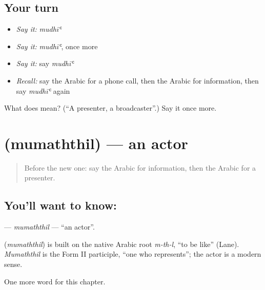\subsection*{Your turn}
\begin{itemize}
\raggedright
  \item \emph{Say it:} \emph{mudhīʿ}
  \item \emph{Say it:} \emph{mudhīʿ}, once more
  \item \emph{Say it:} say \emph{mudhīʿ}
  \item \emph{Recall:} say the Arabic for a phone call, then the Arabic for information, then say \emph{mudhīʿ} again
\end{itemize}

\begin{tcolorbox}[breakable,colback=teal!4,colframe=teal!35!black,title={Before you move on}]
What does  mean? (\textquotedblleft{}A presenter, a broadcaster\textquotedblright{}.) Say it once more.
\end{tcolorbox}
\section[\texorpdfstring{\ar{ممثل} (mumaththil)}{ممثل (mumaththil)}]{ (mumaththil) — an actor}

\label{lesson:AR-C281-mumaththil}



\begin{quote}
Before the new one: say the Arabic for information, then the Arabic for a presenter.
\end{quote}

\subsection*{You'll want to know: }
\textbf{} — \emph{mumaththil} — \textquotedblleft{}an actor\textquotedblright{}.

\begin{cousinweb}
\textbf{} (\emph{mumaththil}) is built on the native Arabic root \emph{m-th-l}, \textquotedblleft{}to be like\textquotedblright{} (Lane). \emph{Mumaththil} is the Form II participle, \textquotedblleft{}one who represents\textquotedblright{}; the actor is a modern sense.
\end{cousinweb}

\begin{grammarlens}[title={What you've built}]
One more word for this chapter.
\end{grammarlens}

